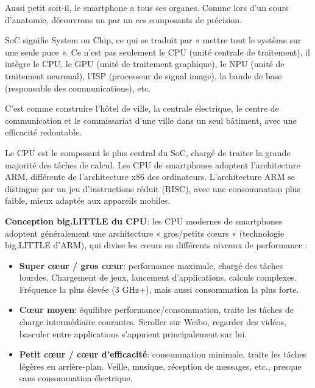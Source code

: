 


Aussi petit soit-il, le smartphone a tous ses organes. Comme lors d'un cours d'anatomie, découvrons un par un ces composants de précision.


SoC signifie System on Chip, ce qui se traduit par « mettre tout le système sur une seule puce ». Ce n'est pas seulement le CPU (unité centrale de traitement), il intègre le CPU, le GPU (unité de traitement graphique), le NPU (unité de traitement neuronal), l'ISP (processeur de signal image), la bande de base (responsable des communications), etc.

C'est comme construire l'hôtel de ville, la centrale électrique, le centre de communication et le commissariat d'une ville dans un seul bâtiment, avec une efficacité redoutable.


Le CPU est le composant le plus central du SoC, chargé de traiter la grande majorité des tâches de calcul. Les CPU de smartphones adoptent l'architecture ARM, différente de l'architecture x86 des ordinateurs. L'architecture ARM se distingue par un jeu d'instructions réduit (RISC), avec une consommation plus faible, mieux adaptée aux appareils mobiles.

\textbf{Conception big.LITTLE du CPU}: les CPU modernes de smartphones adoptent généralement une architecture « gros/petits cœurs » (technologie big.LITTLE d'ARM), qui divise les cœurs en différents niveaux de performance :

\begin{itemize}
  \item \textbf{Super cœur / gros cœur}: performance maximale, chargé des tâches lourdes. Chargement de jeux, lancement d'applications, calculs complexes. Fréquence la plus élevée (3 GHz+), mais aussi consommation la plus forte.
  \item \textbf{Cœur moyen}: équilibre performance/consommation, traite les tâches de charge intermédiaire courantes. Scroller sur Weibo, regarder des vidéos, basculer entre applications s'appuient principalement sur lui.
  \item \textbf{Petit cœur / cœur d'efficacité}: consommation minimale, traite les tâches légères en arrière-plan. Veille, musique, réception de messages, etc., presque sans consommation électrique.
\end{itemize}

